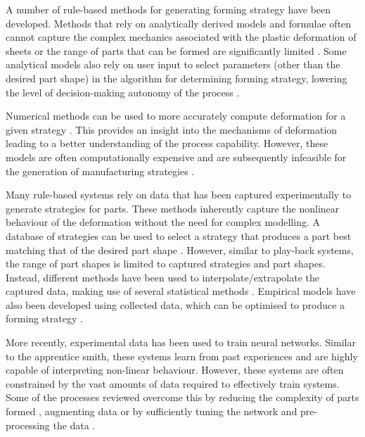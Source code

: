 A number of rule-based methods for generating forming strategy have been developed. Methods that rely on analytically derived models and formulae often cannot capture the complex mechanics associated with the plastic deformation of sheets \citep{Yang2011GeometricalProcess,Yang2009AutomatisierungProgramming,Vazquez2017RoboticWheeling,Polyblank2015TheSpinning} or the range of parts that can be formed are significantly limited \citep{Nzahumunyurwa2001OptimizationProcess}. Some analytical models also rely on user input to select parameters (other than the desired part shape) in the algorithm for determining forming strategy, lowering the level of decision-making autonomy of the process \citep{Tanaka2012DevelopmentSystem,Asakawa2010DevelopmentProcess}.

Numerical methods can be used to more accurately compute deformation for a given strategy \citep{Bowen2021NumericalProcess,Hoffmann2005StudiesMetal}. This provides an insight into the mechanisms of deformation leading to a better understanding of the process capability. However, these models are often computationally expensive and are subsequently infeasible for the generation of manufacturing strategies \citep{Scherer2013MethodenBlechumformung,Polyblank2015TheSpinning}. 

Many rule-based systems rely on data that has been captured experimentally to generate strategies for parts. These methods inherently capture the nonlinear behaviour of the deformation without the need for complex modelling. A database of strategies can be used to select a strategy that produces a part best matching that of the desired part shape \citep{Mori1998IncrementalDatabase}. However, similar to play-back systems, the range of part shapes is limited to captured strategies and part shapes. Instead, different methods have been used to interpolate/extrapolate the captured data, making use of several statistical methods \citep{Opritescu2012AutomatedStrategy,Opritescu2016VariationVariance,Hartmann2019Knowledge-basedPartitioning,Henkenjohann2005AnProcess}. Empirical models have also been developed using collected data, which can be optimised to produce a forming strategy \citep{Mori1996DeterminationAlgorithm,Auer2004ComparisonSpinning}.

More recently, experimental data has been used to train neural networks. Similar to the apprentice smith, these systems learn from past experiences and are highly capable of interpreting non-linear behaviour. However, these systems are often constrained by the vast amounts of data required to effectively train systems. Some of the processes reviewed overcome this by reducing the complexity of parts formed \citep{Opritescu2015AutomatedApproach}, augmenting data \citep{Rossi2018ModellingWheel,Rossi2018Re/LearningSurfaces} or by sufficiently tuning the network and pre-processing the data \citep{Hartmann2019AnFree-forming}.

